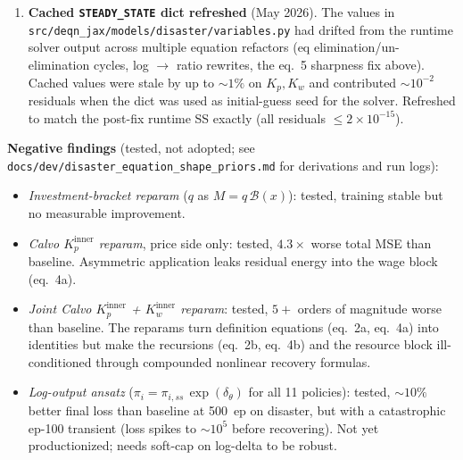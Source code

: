 \documentclass[11pt]{article}
\begin{document}
\begin{enumerate}
\item \textbf{Cached \texttt{STEADY\_STATE} dict refreshed} (May 2026).
  The values in \texttt{src/deqn\_jax/models/disaster/variables.py} had
  drifted from the runtime solver output across multiple equation
  refactors (eq elimination/un-elimination cycles, log $\to$ ratio
  rewrites, the eq.~5 sharpness fix above). Cached values were stale
  by up to $\sim\!1\%$ on $K_p, K_w$ and contributed ${\sim}10^{-2}$
  residuals when the dict was used as initial-guess seed for the
  solver. Refreshed to match the post-fix runtime SS exactly
  (all residuals $\leq 2\times 10^{-15}$).
\end{enumerate}

\bigskip\noindent\textbf{Negative findings} (tested, not adopted; see
\texttt{docs/dev/disaster\_equation\_shape\_priors.md} for derivations
and run logs):

\begin{itemize}
\item \emph{Investment-bracket reparam} ($q$ as $M = q\,\mathcal{B}(x)$):
  tested, training stable but no measurable improvement.
\item \emph{Calvo $K_p^{\text{inner}}$ reparam}, price side only: tested,
  $4.3\times$ worse total MSE than baseline. Asymmetric application leaks
  residual energy into the wage block (eq.~4a).
\item \emph{Joint Calvo $K_p^{\text{inner}}$ + $K_w^{\text{inner}}$
  reparam}: tested, $5+$ orders of magnitude worse than baseline. The
  reparams turn definition equations (eq.~2a, eq.~4a) into identities
  but make the recursions (eq.~2b, eq.~4b) and the resource block
  ill-conditioned through compounded nonlinear recovery formulas.
\item \emph{Log-output ansatz} ($\pi_i = \pi_{i,ss}\,\exp(\delta_\theta)$
  for all 11 policies): tested, $\sim\!10\%$ better final loss than
  baseline at 500~ep on disaster, but with a catastrophic ep-100
  transient (loss spikes to $\sim\!10^5$ before recovering). Not yet
  productionized; needs soft-cap on log-delta to be robust.
\end{itemize}
\end{document}
